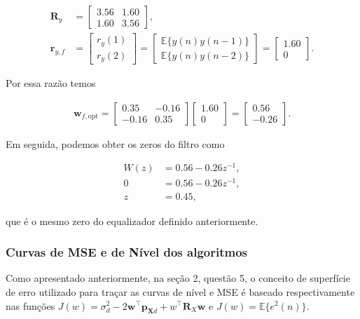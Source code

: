 \begin{align}
    \mathbf{R}_{y} &=
    \begin{bmatrix}
        3.56 & 1.60 \\
        1.60 & 3.56
    \end{bmatrix}, \\
    \mathbf{r}_{y,f} &= 
    \begin{bmatrix}
        r_{y}(1) \\
        r_{y}(2)
    \end{bmatrix} =
    \begin{bmatrix}
        \mathbb{E}\{y(n) y(n - 1)\} \\
        \mathbb{E}\{y(n) y(n - 2)\}
    \end{bmatrix} = 
    \begin{bmatrix}
        1.60 \\
        0
    \end{bmatrix}.
\end{align}

Por essa razão temos

\begin{align}
    \mathbf{w}_{f,\text{opt}} = 
    \begin{bmatrix}
        0.35 & -0.16 \\
        -0.16 & 0.35
    \end{bmatrix}
    \begin{bmatrix}
        1.60 \\
        0
    \end{bmatrix} =
    \begin{bmatrix}
        0.56 \\
        -0.26
    \end{bmatrix}.
\end{align}

Em seguida, podemos obter os zeros do filtro como

\begin{align}
    W(z) &= 0.56 - 0.26 z^{-1}, \\
    0 &= 0.56 - 0.26 z^{-1}, \\
    z &= 0.45,
\end{align}

que é o mesmo zero do equalizador definido anteriormente.


\subsubsection{Curvas de MSE e de Nível dos algoritmos}
Como apresentado anteriormente, na seção 2, questão 5, o conceito de superfície de erro utilizado para traçar as curvas de nível e MSE é baseado respectivamente nas funções $J(w) = \sigma^{2}_{d} - 2\mathbf{w}^{\top}\mathbf{p}_{\mathbf{X} d} + w^{\top}\mathbf{R}_{X}\mathbf{w} $ e $J(w) = \mathbb{E}\{e^{2}(n)\}$.


